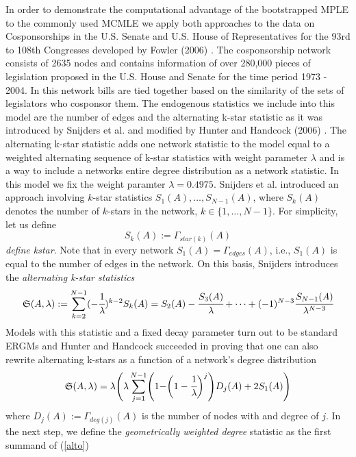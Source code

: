 \documentclass[headsepline=true, abstracton]{scrartcl}
\begin{document}
In order to demonstrate the computational advantage of the bootstrapped MPLE to the commonly used MCMLE we apply both approaches to the data on Cosponsorships in the U.S. Senate and U.S. House of Representatives for the 93rd to 108th Congresses developed by Fowler (2006) \cite{Fowler2006a} \cite{Fowler2006b}. The cosponsorship network consists of 2635 nodes and contains information of over 280,000 pieces of legislation proposed in the U.S. House and Senate for the time period 1973 - 2004. In this network bills are tied together based on the similarity of the sets of legislators who cosponsor them. The endogenous statistics we include into this model are the number of edges and the alternating k-star statistic as it was introduced by Snijders et al. \cite{SnijdersTomA.B..2006} and modified by Hunter and Handcock (2006) \cite{Hunter.2006}. The alternating k-star statistic adds one network statistic to the model equal to a weighted alternating sequence of k-star statistics with weight parameter $\lambda$ and is a way to include a networks entire degree distribution as a network statistic. In this model we fix the weight paramter $\lambda=0.4975$. 
Snijders et al. \cite{SnijdersTomA.B..2006} introduced an approach involving $k$-star statistics $S_1(A), \dots , S_{N-1}(A)$, where $S_k(A)$ denotes the number of $k$-stars in the network, $k \in \{1, \dots , N-1\}$. For simplicity, let us define
$$S_k(A):=\Gamma_{star(k)}(A) $$
\textit{define kstar}.
Note that in every network $S_1(A)=\Gamma_{edges}(A)$, i.e., $S_1(A)$ is equal to the number of edges in the network.
On this basis, Snijders introduces the \textit{alternating k-star statistics}
\begin{equation*}
\mathfrak{S}(A,\lambda):= \sum_{k=2}^{N-1}(-\cfrac{1}{\lambda})^{k-2}S_k(A)=    S_2(A)-\cfrac{S_3(A)}{\lambda}+ \dots + (-1)^{N-3}\cfrac{S_{N-1}(A)}{\lambda^{N-3}}
\end{equation*} 
Models with this statistic and a fixed decay parameter turn out to be standard ERGMs and Hunter and Handcock \cite{Hunter.2006} succeeded in proving that one can also rewrite alternating k-stars as a function of a network's degree distribution
\begin{equation}
\mathfrak{S}(A,\lambda)= \lambda\Biggr(\lambda\sum_{j=1}^{N-1}\Biggr( 1-\biggr(1-\cfrac{1}{\lambda}\biggl)^j\Biggl)D_j(A) + 2S_1(A)\Biggl)
\label{alto}
\end{equation}
where $D_j(A):= \Gamma_{deg(j)}(A)$ is the number of nodes with and degree of $j$. 
In the next step, we define the \textit{geometrically weighted degree} statistic as the first summand of (\ref{alto})
\end{document}
